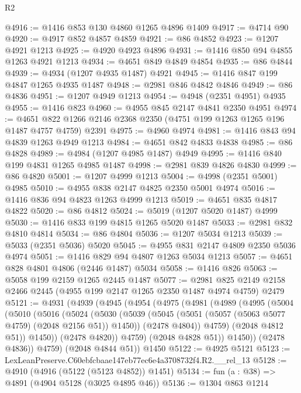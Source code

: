 \begin{lexlean}{R2}
\begin{coremodule}
@4916 := @1416 @853 @130 @4860 @1265 @4896 @1409
@4917 := @4714 @90
@4920 := @4917 @852 @4857 @4859
@4921 := @86 @4852
@4923 := @1207 @4921 @1213
@4925 := @4920 @4923 @4896
@4931 := @1416 @850 @94 @4855 @1263 @4921 @1213
@4934 := @4651 @849 @4849 @4854
@4935 := @86 @4844
@4939 := @4934 (@1207 @4935 @1487) @4921
@4945 := @1416 @847 @199 @4847 @1265 @4935 @1487
@4948 := @2981 @846 @4842 @4846
@4949 := @86 @4836
@4951 := @1207 @4949 @1213
@4954 := @4948 (@2351 @4951) @4935
@4955 := @1416 @823
@4960 := @4955 @845 @2147 @4841 @2350 @4951
@4974 := @4651 @822 @1266 @2146 @2368 @2350 (@4751 @199 @1263 @1265 @196 @1487 @4757 @4759) @2391
@4975 := @4960 @4974
@4981 := @1416 @843 @94 @4839 @1263 @4949 @1213
@4984 := @4651 @842 @4833 @4838
@4985 := @86 @4828
@4989 := @4984 (@1207 @4985 @1487) @4949
@4995 := @1416 @840 @199 @4831 @1265 @4985 @1487
@4998 := @2981 @839 @4826 @4830
@4999 := @86 @4820
@5001 := @1207 @4999 @1213
@5004 := @4998 (@2351 @5001) @4985
@5010 := @4955 @838 @2147 @4825 @2350 @5001 @4974
@5016 := @1416 @836 @94 @4823 @1263 @4999 @1213
@5019 := @4651 @835 @4817 @4822
@5020 := @86 @4812
@5024 := @5019 (@1207 @5020 @1487) @4999
@5030 := @1416 @833 @199 @4815 @1265 @5020 @1487
@5033 := @2981 @832 @4810 @4814
@5034 := @86 @4804
@5036 := @1207 @5034 @1213
@5039 := @5033 (@2351 @5036) @5020
@5045 := @4955 @831 @2147 @4809 @2350 @5036 @4974
@5051 := @1416 @829 @94 @4807 @1263 @5034 @1213
@5057 := @4651 @828 @4801 @4806 (@2446 @1487) @5034
@5058 := @1416 @826
@5063 := @5058 @199 @2159 @1265 @2445 @1487
@5077 := @2981 @825 @2149 @2158 @2466 @2445 (@4955 @199 @2147 @1265 @2350 @1487 @4974 @4759) @2479
@5121 := @4931
    (@4939
      (@4945
        (@4954
          (@4975
            (@4981
              (@4989
                (@4995
                  (@5004
                    (@5010
                      (@5016
                        (@5024
                          (@5030
                            (@5039
                              (@5045 (@5051 (@5057 (@5063 @5077 @4759) (@2048 @2156 @51)) @1450))
                              (@2478 @4804))
                            @4759)
                          (@2048 @4812 @51))
                        @1450))
                    (@2478 @4820))
                  @4759)
                (@2048 @4828 @51))
              @1450))
          (@2478 @4836))
        @4759)
      (@2048 @4844 @51))
    @1450
@5122 := @4925 @5121
@5123 := LexLeanPreserve.C60ebfcbaae147eb77ec6e4a3708732f4.R2.__rel_13
@5128 := @4910 (@4916 (@5122 (@5123 @4852)) @1451)
@5134 := fun (a : @38) => @4891 (@4904 @5128 (@3025 @4895 @46))
@5136 := @1304 @863 @1214

\end{coremodule}
\end{lexlean}
